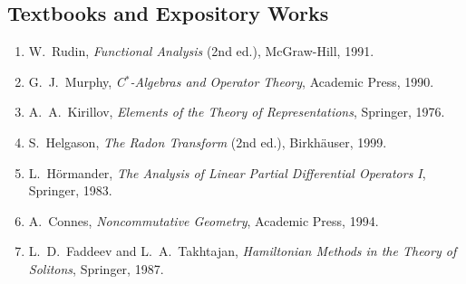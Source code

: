 \subsection*{Textbooks and Expository Works}
\begin{enumerate}
    \item W.\ Rudin, \textit{Functional Analysis} (2nd ed.), McGraw-Hill, 1991.
    \item G.\ J.\ Murphy, \textit{C$^*$-Algebras and Operator Theory}, Academic Press, 1990.
    \item A.\ A.\ Kirillov, \textit{Elements of the Theory of Representations}, Springer, 1976.
    \item S.\ Helgason, \textit{The Radon Transform} (2nd ed.), Birkh\"auser, 1999.
    \item L.\ H\"ormander, \textit{The Analysis of Linear Partial Differential Operators I}, Springer, 1983.
    \item A.\ Connes, \textit{Noncommutative Geometry}, Academic Press, 1994.
    \item L.\ D.\ Faddeev and L.\ A.\ Takhtajan, \textit{Hamiltonian Methods in the Theory of Solitons}, Springer, 1987.
\end{enumerate}
